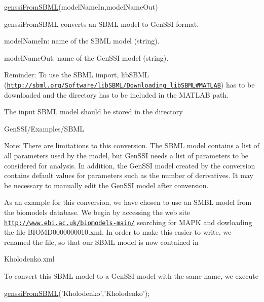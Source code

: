 \begin{DoxyCode}
\hyperlink{genssi_from_s_b_m_l_8m_ac2706c18c7bc41d86451353085eaf2ff}{genssiFromSBML}(modelNameIn,modelNameOut) 
\end{DoxyCode}


genssi\+From\+S\+B\+ML converts an S\+B\+ML model to Gen\+S\+SI format.

model\+Name\+In\+: name of the S\+B\+ML model (string).

model\+Name\+Out\+: name of the Gen\+S\+SI model (string).

Reminder\+: To use the S\+B\+ML import, lib\+S\+B\+ML (\href{http://sbml.org/Software/libSBML/Downloading_libSBML#MATLAB}{\tt http\+://sbml.\+org/\+Software/lib\+S\+B\+M\+L/\+Downloading\+\_\+lib\+S\+B\+M\+L\#\+M\+A\+T\+L\+AB}) has to be downloaded and the directory has to be included in the M\+A\+T\+L\+AB path.

The input S\+B\+ML model should be stored in the directory 
\begin{DoxyCode}
GenSSI/Examples/SBML
\end{DoxyCode}


Note\+: There are limitations to this conversion. The S\+B\+ML model contains a list of all parameters used by the model, but Gen\+S\+SI needs a list of parameters to be considered for analysis. In addition, the Gen\+S\+SI model created by the conversion contains default values for parameters such as the number of derivatives. It may be necessary to manually edit the Gen\+S\+SI model after conversion.

As an example for this conversion, we have chosen to use an S\+M\+BL model from the biomodels database. We begin by accessing the web site \href{http://www.ebi.ac.uk/biomodels-main/}{\tt http\+://www.\+ebi.\+ac.\+uk/biomodels-\/main/} searching for M\+A\+PK and dowloading the file B\+I\+O\+M\+D0000000010.\+xml. In order to make this easier to write, we renamed the file, so that our S\+B\+ML model is now contained in


\begin{DoxyCode}
Kholodenko.xml 
\end{DoxyCode}


To convert this S\+B\+ML model to a Gen\+S\+SI model with the same name, we execute


\begin{DoxyCode}
\hyperlink{genssi_from_s_b_m_l_8m_ac2706c18c7bc41d86451353085eaf2ff}{genssiFromSBML}(\textcolor{stringliteral}{'Kholodenko'},\textcolor{stringliteral}{'Kholodenko'}); 
\end{DoxyCode}



